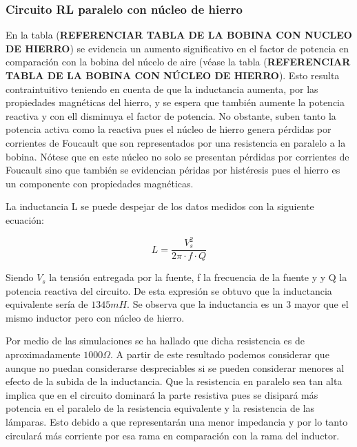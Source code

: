 \subsubsection{Circuito RL paralelo con núcleo de hierro}
En la tabla (\textbf{REFERENCIAR TABLA DE LA BOBINA CON NUCLEO DE HIERRO}) se evidencia un aumento significativo en el factor de potencia en comparación con la bobina del núcelo de aire (véase la tabla (\textbf{REFERENCIAR TABLA DE LA BOBINA CON NÚCLEO DE HIERRO}). Esto resulta contraintuitivo teniendo en cuenta de que la inductancia aumenta, por las propiedades magnéticas del hierro, y se espera que también aumente la potencia reactiva y con ell disminuya el factor de potencia. No obstante, suben tanto la potencia activa como la reactiva pues el núcleo de hierro genera pérdidas por corrientes de Foucault que son representados por una resistencia en paralelo a la bobina. Nótese que en este núcleo no solo se presentan pérdidas por corrientes de Foucault sino que también se evidencian péridas por histéresis pues el hierro es un componente con propiedades magnéticas.

La inductancia L se puede despejar de los datos medidos con la siguiente ecuación:

\[
L = \frac{V_s^2}{2\pi \cdot  f \cdot Q}
\]

Siendo $V_s$ la tensión entregada por la fuente, f la frecuencia de la fuente y y Q la potencia reactiva del circuito. De esta expresión se obtuvo que la inductancia equivalente sería de $1345mH$. Se observa que la inductancia es un $3$ mayor que el mismo inductor pero con núcleo de hierro. 

Por medio de las simulaciones se ha hallado que dicha resistencia es de aproximadamente $1000\Omega$. A partir de este resultado podemos considerar que aunque no puedan considerarse despreciables si se pueden considerar menores al efecto de la subida de la inductancia.  Que la resistencia en paralelo sea tan alta implica que en el circuito dominará la parte resistiva pues se disipará más potencia en el paralelo de la resistencia equivalente y la resistencia de las lámparas. Esto debido a que representarán una menor impedancia y por lo tanto circulará más corriente por esa rama en comparación con la rama del inductor.  


